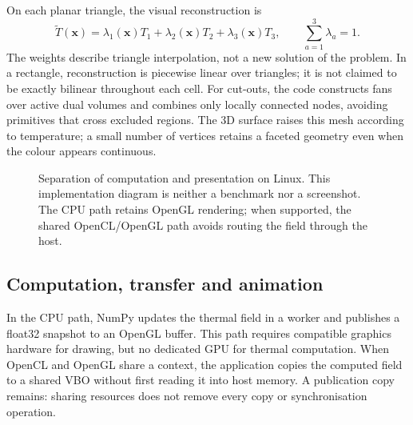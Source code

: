 \documentclass[11pt,a4paper]{article}
\begin{document}
On each planar triangle, the visual reconstruction is
\begin{equation}
 \widetilde T(\mathbf x)=\lambda_1(\mathbf x)T_1+\lambda_2(\mathbf x)T_2+\lambda_3(\mathbf x)T_3,\qquad \sum_{a=1}^{3}\lambda_a=1.
 \label{eq:render}
\end{equation}
The weights describe triangle interpolation, not a new solution of the problem. In a rectangle, reconstruction is piecewise linear over triangles; it is not claimed to be exactly bilinear throughout each cell. For cut-outs, the code constructs fans over active dual volumes and combines only locally connected nodes, avoiding primitives that cross excluded regions. The 3D surface raises this mesh according to temperature; a small number of vertices retains a faceted geometry even when the colour appears continuous.

\begin{figure}[tbp]\centering
{}
\caption{Separation of computation and presentation on Linux. This implementation diagram is neither a benchmark nor a screenshot. The CPU path retains OpenGL rendering; when supported, the shared OpenCL/OpenGL path avoids routing the field through the host.}\label{fig:pipeline}
\end{figure}

\subsection{Computation, transfer and animation}
In the CPU path, NumPy updates the thermal field in a worker and publishes a float32 snapshot to an OpenGL buffer. This path requires compatible graphics hardware for drawing, but no dedicated GPU for thermal computation. When OpenCL and OpenGL share a context, the application copies the computed field to a shared VBO without first reading it into host memory. A publication copy remains: sharing resources does not remove every copy or synchronisation operation.
\end{document}
